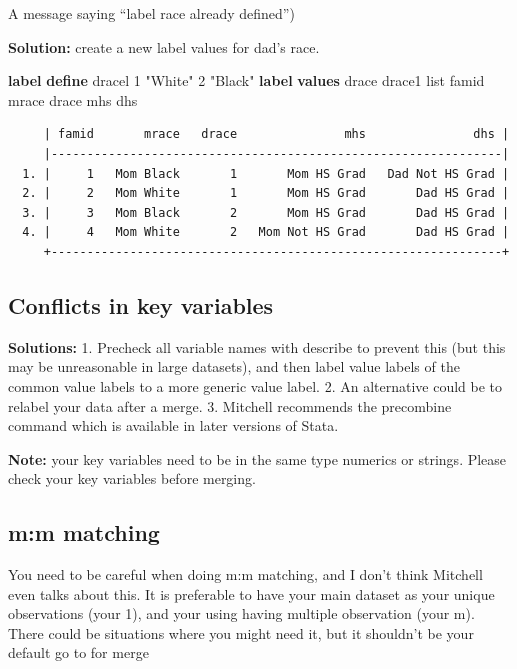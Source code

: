 \documentclass[
]{book}
\newenvironment{Shaded}{\begin{snugshade}}{\end{snugshade}}
\newcommand{\KeywordTok}[1]{\textcolor[rgb]{0.13,0.29,0.53}{\textbf{#1}}}
\newcommand{\NormalTok}[1]{#1}
\newcommand{\OtherTok}[1]{\textcolor[rgb]{0.56,0.35,0.01}{#1}}
\newcommand{\StringTok}[1]{\textcolor[rgb]{0.31,0.60,0.02}{#1}}
\begin{document}
A message saying ``label race already defined'')

\textbf{Solution:} create a new label values for dad's race.

\begin{Shaded}
\begin{Highlighting}[]
\KeywordTok{label} \KeywordTok{define}\NormalTok{ dracel 1 }\StringTok{"White"}\NormalTok{ 2 }\StringTok{"Black"}
\KeywordTok{label} \KeywordTok{values}\NormalTok{ drace drace1}
\OtherTok{list}\NormalTok{ famid mrace drace mhs dhs}
\end{Highlighting}
\end{Shaded}

\begin{verbatim}
     | famid       mrace   drace               mhs               dhs |
     |---------------------------------------------------------------|
  1. |     1   Mom Black       1       Mom HS Grad   Dad Not HS Grad |
  2. |     2   Mom White       1       Mom HS Grad       Dad HS Grad |
  3. |     3   Mom Black       2       Mom HS Grad       Dad HS Grad |
  4. |     4   Mom White       2   Mom Not HS Grad       Dad HS Grad |
     +---------------------------------------------------------------+
\end{verbatim}

\subsection*{Conflicts in key variables}\label{conflicts-in-key-variables}

\textbf{Solutions:}
1. Precheck all variable names with describe to prevent this (but this may be unreasonable in large datasets), and then label value labels of the common value labels to a more generic value label.
2. An alternative could be to relabel your data after a merge.
3. Mitchell recommends the precombine command which is available in later versions of Stata.

\textbf{Note:} your key variables need to be in the same type numerics or strings.
Please check your key variables before merging.

\subsection*{m:m matching}\label{mm-matching}

You need to be careful when doing m:m matching, and I don't think Mitchell even talks about this. It is preferable to have your main dataset as your unique observations (your 1), and your using having multiple observation (your m). There could be situations where you might need it, but it shouldn't be your default go to for merge
\end{document}
